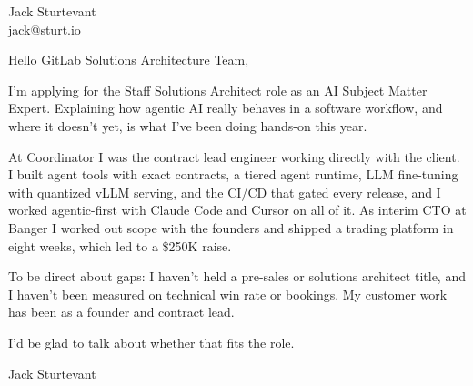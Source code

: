 \documentclass[11pt]{article}
\begin{document}
\raggedright

{\namefont\fontsize{20pt}{24pt}\selectfont Jack Sturtevant}\\[-0.3em]
jack@sturt.io

\vspace{1.2em}

Hello GitLab Solutions Architecture Team,

I'm applying for the Staff Solutions Architect role as an AI Subject Matter Expert. Explaining how agentic AI really behaves in a software workflow, and where it doesn't yet, is what I've been doing hands-on this year.

At Coordinator I was the contract lead engineer working directly with the client. I built agent tools with exact contracts, a tiered agent runtime, LLM fine-tuning with quantized vLLM serving, and the CI/CD that gated every release, and I worked agentic-first with Claude Code and Cursor on all of it. As interim CTO at Banger I worked out scope with the founders and shipped a trading platform in eight weeks, which led to a \$250K raise.

To be direct about gaps: I haven't held a pre-sales or solutions architect title, and I haven't been measured on technical win rate or bookings. My customer work has been as a founder and contract lead.

I'd be glad to talk about whether that fits the role.

\vspace{0.6em}
Jack Sturtevant
\end{document}
